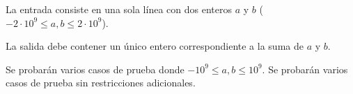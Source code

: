 \documentclass{oci}
\begin{document}
\begin{inputDescription}
  La entrada consiste en una sola línea con dos enteros $a$ y $b$ ($-2\cdot10^9 \leq a, b \leq 2\cdot10^9$).
\end{inputDescription}

\begin{outputDescription}
  La salida debe contener un único entero correspondiente a la suma de $a$ y $b$.
\end{outputDescription}

\begin{scoreDescription}
   Se probarán varios casos de prueba donde $-10^9\leq a, b \leq 10^9$.
   Se probarán varios casos de prueba sin restricciones adicionales.
\end{scoreDescription}

\begin{sampleDescription}
\end{sampleDescription}
\end{document}
